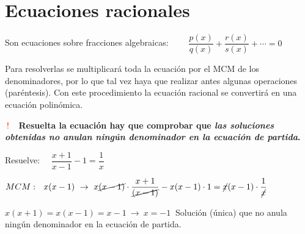 \vspace{1cm}
\section{Ecuaciones racionales}
\vspace{0.5cm}


\begin{definition}

Son ecuaciones sobre fracciones algebraicas: $\qquad \dfrac{p(x)}{q(x)}+	\dfrac{r(x)}{s(x)}+\cdots = 0$
\end{definition}



\begin{theorem}

Para resolverlas se multiplicará toda la ecuación por el MCM de los denominadores, por lo que tal vez haya que realizar antes algunas operaciones (paréntesis). Con este procedimiento la ecuación racional se convertirá en una ecuación polinómica.


\vspace{5mm} 
\begin{destacado}
\begin{small}
 \textcolor{red}{$\boldsymbol{\boxed{ \ ! \ }} $}  $\ $ \textbf{Resuelta la ecuación hay que comprobar que \emph{las soluciones obtenidas no anulan ningún denominador en la ecuación de partida}.}
 \end{small}
 \end{destacado}
	
\end{theorem}

\begin{miejemplo}

Resuelve: $ \quad \dfrac{x+1}{x-1}-1=\dfrac 1 x$

\vspace{5mm} $MCM:\ \ x(x-1) \ \to \ 	x \cancel{(x-1)} \cdot \dfrac{x+1}{\cancel{(x-1)}}-x(x-1) \cdot 1=\cancel{x} (x-1) \cdot \dfrac 1 {\cancel{x}}$

$x(x+1)=x(x-1)=x-1 \ \to \ x=-1 \ $ Solución (única) que no anula ningún denominador en la ecuación de partida.
\end{miejemplo}

